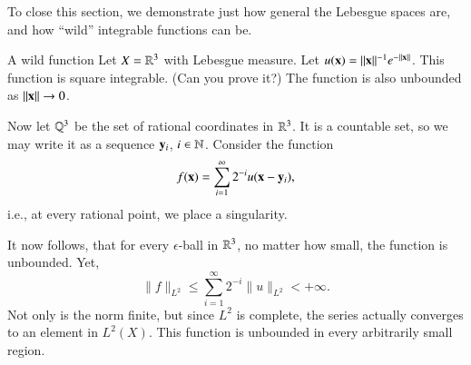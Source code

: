 To close this section, we demonstrate just how general the Lebesgue spaces are, and how ``wild'' integrable functions can be.

\begin{myExample}{A wild function}{}
Let $X = \mathbb{R}^3$ with Lebesgue measure. Let $u(\mathbf{x}) = \|\mathbf{x}\|^{-1} e^{-\|\mathbf{x}\|}$. This function is square integrable. (Can you prove it?) The function is also unbounded as $\|\mathbf{x}\|\to 0$.

Now let $\mathbb{Q}^3$ be the set of rational coordinates in $\mathbb{R}^3$. It is a countable set, so we may write it as a sequence $\mathbf{y}_i$, $i \in \mathbb{N}$. Consider the function
\begin{equation}
    f(\mathbf{x}) = \sum_{i=1}^\infty 2^{-i} u(\mathbf{x}-\mathbf{y}_i),
\end{equation}
i.e., at every rational point, we place a singularity. 

It now follows, that for every $\epsilon$-ball in $\mathbb{R}^3$, no matter how small, the function is unbounded. Yet,
\begin{equation}
    \|f\|_{L^2} \leq \sum_{i=1}^\infty 2^{-i} \|u\|_{L^2} < +\infty.
\end{equation}
Not only is the norm finite, but since $L^2$ is complete, the series actually converges to an element in $L^2(X)$. This function is unbounded in every arbitrarily small region.
\end{myExample}


